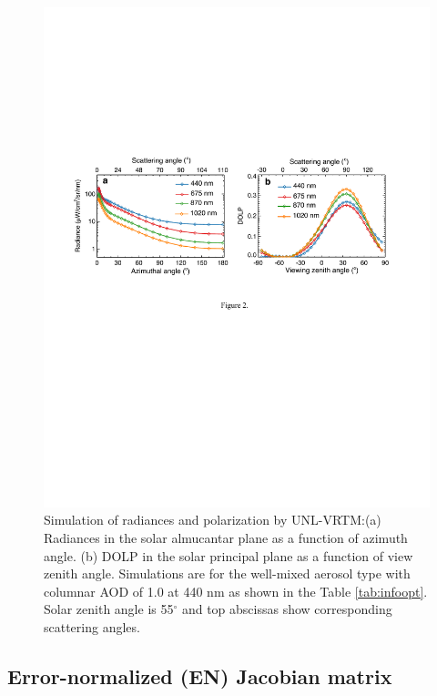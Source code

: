 \begin{figure}[t]
  \centering
  \includegraphics[width={\textwidth}]{figures/info02.pdf}
  \caption[Simulation of radiances and polarization by UNL-VRTM.]
{Simulation of radiances and polarization by UNL-VRTM:(a) Radiances in the 
solar almucantar plane as a function of azimuth angle. (b) DOLP in the solar 
principal plane as a function of view zenith angle. Simulations are for
the well-mixed aerosol type with columnar AOD of 1.0 at 440 nm as shown in the
Table \ref{tab:infoopt}. Solar zenith angle is 55$^\circ$ and top abscissas 
show corresponding scattering angles.}
  \label{fig:infosimu}
\end{figure}

\subsection{Error-normalized (EN) Jacobian matrix} \label{subsec:enj}

